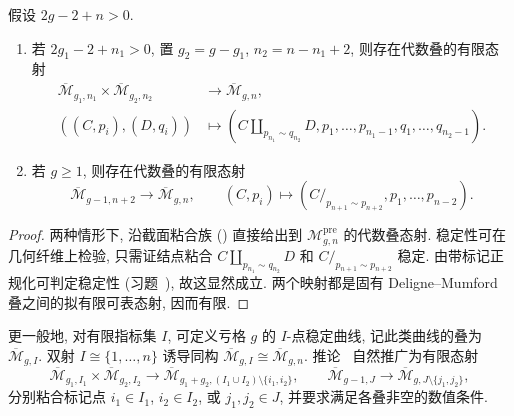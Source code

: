 \begin{corollary}[粘合态射]\label{src:6.6.16}
假设 $2g-2+n>0$.
\begin{enumerate}[(1)]
\item 若 $2g_1-2+n_1>0$, 置 $g_2=g-g_1$, $n_2=n-n_1+2$, 则存在代数叠的有限态射
\[
\begin{aligned}
\overline{\mathcal M}_{g_1,n_1}\times\overline{\mathcal M}_{g_2,n_2}&\to\overline{\mathcal M}_{g,n},\\
((C,p_i),(D,q_i))&\mapsto(C\amalg_{p_{n_1}\sim q_{n_2}}D,p_1,\ldots,p_{n_1-1},q_1,\ldots,q_{n_2-1}).
\end{aligned}
\]
\item 若 $g\geq1$, 则存在代数叠的有限态射
\[
\overline{\mathcal M}_{g-1,n+2}\to\overline{\mathcal M}_{g,n},\qquad
(C,p_i)\mapsto(C/_{p_{n+1}\sim p_{n+2}},p_1,\ldots,p_{n-2}).
\]
\end{enumerate}
\end{corollary}
\begin{proof}
两种情形下, 沿截面粘合族 () 直接给出到 $\mathcal M_{g,\allowbreak n}^{\mathrm{pre}}$ 的代数叠态射. 稳定性可在几何纤维上检验, 只需证结点粘合 $C\amalg_{p_{n_1}\sim q_{n_2}}D$ 和 $C/_{p_{n+1}\sim p_{n+2}}$ 稳定. 由带标记正规化可判定稳定性 (习题~), 故这显然成立. 两个映射都是固有 Deligne--Mumford 叠之间的拟有限可表态射, 因而有限.
\end{proof}
更一般地, 对有限指标集 $I$, 可定义亏格 $g$ 的 $I$-点稳定曲线, 记此类曲线的叠为 $\overline{\mathcal M}_{g,\allowbreak I}$. 双射 $I\cong\{1,\allowbreak \ldots,\allowbreak n\}$ 诱导同构 $\overline{\mathcal M}_{g,\allowbreak I}\cong\overline{\mathcal M}_{g,\allowbreak n}$. 推论~ 自然推广为有限态射
\[
\overline{\mathcal M}_{g_1,I_1}\times\overline{\mathcal M}_{g_2,I_2}\to\overline{\mathcal M}_{g_1+g_2,(I_1\cup I_2)\setminus\{i_1,i_2\}},\qquad
\overline{\mathcal M}_{g-1,J}\to\overline{\mathcal M}_{g,J\setminus\{j_1,j_2\}},
\]
分别粘合标记点 $i_1\in I_1$, $i_2\in I_2$, 或 $j_1,\allowbreak j_2\in J$, 并要求满足各叠非空的数值条件.
